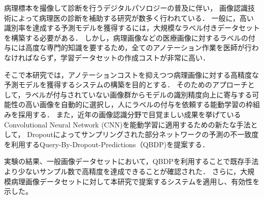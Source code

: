 病理標本を撮像して診断を行うデジタルパソロジーの普及に伴い，
画像認識技術によって病理医の診断を補助する研究が数多く行われている．
一般に，高い識別率を達成する予測モデルを獲得するには，大規模なラベル付きデータセットを構築する必要がある．
しかし，病理画像などの医療画像に対するラベルの付与には高度な専門的知識を要するため，全てのアノテーション作業を医師が行わなければならず，学習データセットの作成コストが非常に高い．

そこで本研究では，アノテーションコストを抑えつつ病理画像に対する高精度な予測モデルを獲得するシステムの構築を目的とする．
そのためのアプローチとして，ラベルが付与されていない画像群からモデルの識別精度向上に寄与する可能性の高い画像を自動的に選択し，人にラベルの付与を依頼する能動学習の枠組みを採用する．
また，近年の画像認識分野で目覚ましい成果を挙げているConvolutional Neural Network (CNN)を能動学習に適用するための新たな手法として，
Dropoutによってサンプリングされた部分ネットワークの予測の不一致度を利用するQuery-By-Dropout-Predictions（QBDP)を提案する．

実験の結果、一般画像データセットにおいて，QBDPを利用することで既存手法より少ないサンプル数で高精度を達成できることが確認された．
さらに，大規模病理画像データセットに対して本研究で提案するシステムを適用し、有効性を示した。
